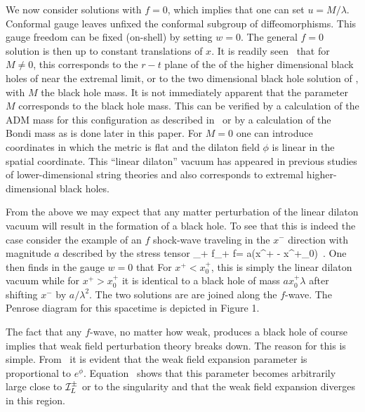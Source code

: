 We now consider solutions with $f=0$, which implies that one can set
$u=M/\lambda$. Conformal
gauge leaves unfixed the conformal subgroup of diffeomorphisms.  This
gauge freedom can be fixed (on-shell) by setting $w=0$.  The general $f=0$
solution
is then
%
\eqn{}
%
up to constant translations of $x$. It is readily
seen \GiSt\ that for $M\not=0$, this corresponds to the $r-t$ plane of
the of the
higher dimensional black holes of  near the extremal
limit, or to the two dimensional
black hole solution of \Witt, with $M$ the black hole mass.
It is not immediately apparent that the parameter $M$ corresponds to the
black hole mass.  This can be verified by a calculation of the ADM
mass for this configuration as described in \Witt\ or by a
calculation of the Bondi mass as is done later in this paper.
For $M=0$ one can introduce coordinates in which the metric is flat and
the dilaton field $\phi$ is linear in the spatial coordinate.
This ``linear dilaton'' vacuum has appeared in previous studies
of lower-dimensional string theories and also corresponds to extremal
higher-dimensional black holes.

{}From the  above we may expect that any matter perturbation of the linear
dilaton vacuum will result in the formation of a black hole. To see that
this is indeed the case consider the example of
an $f$ shock-wave traveling in the $x^-$ direction with magnitude $a$
described by the stress tensor
\eqn\twelve
{\half \partial_+ f\partial_+ f= a\delta (x^+ - x^+_0)\ .}
One then finds in the gauge $w=0$ that
\eqn{}
For $x^+<x^+_0$, this is  simply the linear dilaton vacuum while for
$x^+ > x^+_0$ it is identical to a black hole of mass $ax^+_0 \lambda$ after
shifting $x^-$ by $a/\lambda^2$.
The two solutions are
are joined along the $f$-wave.  The Penrose diagram for this
spacetime is depicted in Figure 1.
\goodbreak
\topinsert
\centerline{}
\endinsert

The fact that any $f$-wave, no matter how weak, produces
a black hole of course implies that weak field perturbation theory
breaks down. The reason for this is simple. From \one\ it is
evident that the weak field expansion parameter is proportional to
$e^{\phi}$. Equation \thirteen\ shows that this parameter becomes arbitrarily
large close to ${\cal I}_L^\pm$ or to the singularity and that
the weak field expansion diverges in this region.

